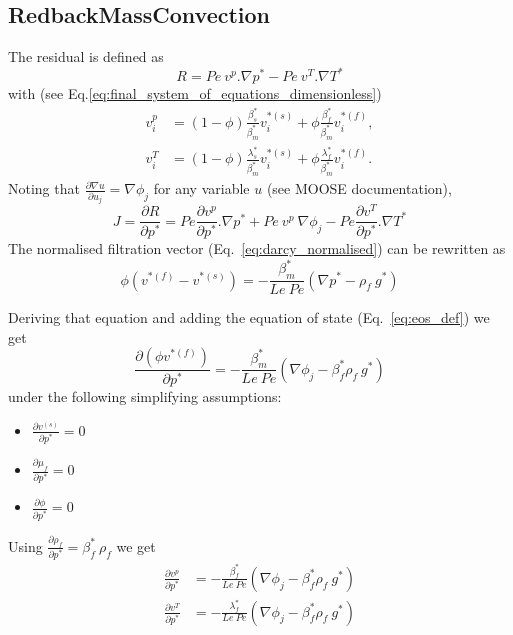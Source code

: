 \documentclass[]{scrreprt}
\newcommand{\moose}{{MOOSE}}
\begin{document}
\subsection{RedbackMassConvection}
The residual is defined as
\begin{equation}
  R = Pe\: v^p.\nabla p^* - Pe\:v^T.\nabla T^*
\end{equation}
with (see Eq.\ref{eq:final_system_of_equations_dimensionless})
\begin{align*}
  v_i^p &= (1-\phi)\frac{\beta^*_s}{\beta^*_m} v_i^{*(s)} + 
    \phi\frac{\beta^*_f}{\beta^*_m}v_i^{*(f)}, \\
  v^T_i &= (1-\phi)\frac{\lambda^*_s}{\beta^*_m} v_i^{*(s)} + 
    \phi\frac{\lambda^*_f}{\beta^*_m} v_i^{*(f)}.
\end{align*}
Noting that $\frac{\partial \nabla u}{\partial u_j}=\nabla \phi_j$ for any variable $u$ (see \moose{} documentation),
\begin{equation}
  \label{eq:def_jac_mass_conv}
  J = \frac{\partial R}{\partial p^*} = Pe \frac{\partial v^p}{\partial p^*}.\nabla p^* + Pe\:v^p\:\nabla \phi_j - Pe\frac{\partial v^T}{\partial p^*}.\nabla T^*
\end{equation}
The normalised filtration vector (Eq.~\ref{eq:darcy_normalised}) can be rewritten as
\begin{equation}
 \label{eq:darcy_normalised2}
  \phi (v^{*(f)} - v^{*(s)}) = -\frac{\beta^*_m}{Le\:Pe} \left(\nabla p^* - \rho_f\:g^* \right)
\end{equation}

Deriving that equation and adding the equation of state (Eq.~\ref{eq:eos_def}) we get
\begin{equation}
  \frac{\partial (\phi v^{*(f)})}{\partial p^*} = -\frac{\beta^*_m}{Le\:Pe} \left(\nabla \phi_j - \beta^*_f\rho_f\:g^* \right)
\end{equation}
under the following simplifying assumptions:
\begin{itemize}
 \item $\frac{\partial v^{(s)}}{\partial p^*}=0$
 \item $\frac{\partial \mu_f}{\partial p^*}=0$
 \item $\frac{\partial \phi}{\partial p^*}=0$
\end{itemize}
Using $\frac{\partial \rho_f}{\partial p^*} = \beta^*_f \: \rho_f$ we get
\begin{subequations}
  \label{eq:derivatives_vT_vp}
  \begin{align}
     \frac{\partial v^p}{\partial p^*} &= -\frac{\beta^*_f}{Le\:Pe} \left(\nabla \phi_j - \beta^*_f\rho_f\:g^* \right) \\
  \frac{\partial v^T}{\partial p^*} &= -\frac{\lambda^*_f}{Le\:Pe} \left(\nabla \phi_j - \beta^*_f\rho_f\:g^* \right)
  \end{align}
\end{subequations}
\end{document}
